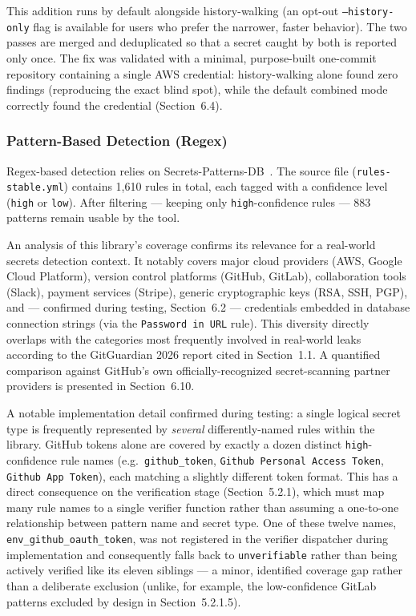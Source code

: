 \documentclass[12pt]{article}
\begin{document}
This addition runs by default alongside history-walking (an opt-out \texttt{--history-only} flag is available for users who prefer the narrower, faster behavior). The two passes are merged and deduplicated so that a secret caught by both is reported only once. The fix was validated with a minimal, purpose-built one-commit repository containing a single AWS credential: history-walking alone found zero findings (reproducing the exact blind spot), while the default combined mode correctly found the credential (Section~6.4).

\subsubsection{Pattern-Based Detection (Regex)}

Regex-based detection relies on Secrets-Patterns-DB~\cite{secretspatternsdb}. The source file (\texttt{rules-stable.yml}) contains 1,610 rules in total, each tagged with a confidence level (\texttt{high} or \texttt{low}). After filtering --- keeping only \texttt{high}-confidence rules --- 883 patterns remain usable by the tool.

An analysis of this library's coverage confirms its relevance for a real-world secrets detection context. It notably covers major cloud providers (AWS, Google Cloud Platform), version control platforms (GitHub, GitLab), collaboration tools (Slack), payment services (Stripe), generic cryptographic keys (RSA, SSH, PGP), and --- confirmed during testing, Section~6.2 --- credentials embedded in database connection strings (via the \texttt{Password in URL} rule). This diversity directly overlaps with the categories most frequently involved in real-world leaks according to the GitGuardian 2026 report cited in Section~1.1. A quantified comparison against GitHub's own officially-recognized secret-scanning partner providers is presented in Section~6.10.

A notable implementation detail confirmed during testing: a single logical secret type is frequently represented by \emph{several} differently-named rules within the library. GitHub tokens alone are covered by exactly a dozen distinct \texttt{high}-confidence rule names (e.g.\ \texttt{github\_token}, \texttt{Github Personal Access Token}, \texttt{Github App Token}), each matching a slightly different token format. This has a direct consequence on the verification stage (Section~5.2.1), which must map many rule names to a single verifier function rather than assuming a one-to-one relationship between pattern name and secret type. One of these twelve names, \texttt{env\_github\_oauth\_token}, was not registered in the verifier dispatcher during implementation and consequently falls back to \texttt{unverifiable} rather than being actively verified like its eleven siblings --- a minor, identified coverage gap rather than a deliberate exclusion (unlike, for example, the low-confidence GitLab patterns excluded by design in Section~5.2.1.5).
\end{document}

